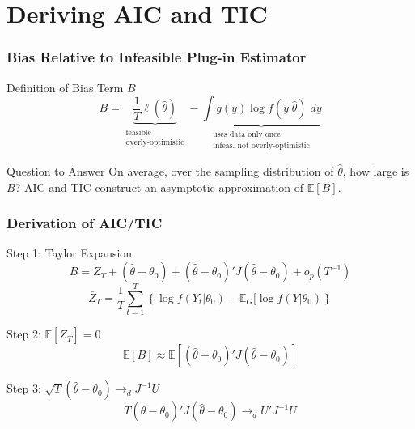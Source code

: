 \section{Deriving AIC and TIC}
\begin{frame}
  \frametitle{Bias Relative to Infeasible Plug-in Estimator}


  \begin{block}{Definition of Bias Term $B$}
  \[
    B = \underbrace{\frac{1}{T} \ell(\widehat{\theta})}_{\substack{ \text{feasible}\\ \text{overly-optimistic}}} - \underbrace{\int g(y) \log f(y|\widehat{\theta})\; dy}_{\substack{\text{uses data only once} \\ \text{infeas.\ not overly-optimistic}}}
  \]
\end{block}

\pause

\begin{alertblock}{Question to Answer}
  On average, over the sampling distribution of $\widehat{\theta}$, how large is $B$? AIC and TIC construct an asymptotic approximation of $\mathbb{E}[B]$.
\end{alertblock}

\end{frame}
\begin{frame}
  \frametitle{Derivation of AIC/TIC}
  \begin{block}{Step 1: Taylor Expansion}
    \vspace{-1em}
    \[B = \bar{Z}_T + (\widehat{\theta} - \theta_0) + (\widehat{\theta} - \theta_0)' J  (\widehat{\theta} - \theta_0) + o_p(T^{-1})\]
    \footnotesize
    \[\bar{Z}_T = \frac{1}{T} \sum_{t=1}^T \left\{ \log f(Y_t|\theta_0) - \mathbb{E}_G[\log f(Y|\theta_0) \right\}\]
  \end{block}

  \vspace{-1em}

  \pause

  \begin{block}{Step 2: $\mathbb{E}[\bar{Z}_T] = 0$}
    \vspace{-1.5em}
    \[\mathbb{E}[B] \approx \mathbb{E}\left[ (\widehat{\theta} - \theta_0)'J(\widehat{\theta} - \theta_0) \right]\]
  \end{block}

  \pause

  \vspace{-1em}

  \begin{block}{Step 3: $\sqrt{T}(\widehat{\theta} - \theta_0) \rightarrow_d J^{-1}U$}
    \vspace{-1.5em}
    \[
      T(\widehat{\theta} - \theta_0)'J(\widehat{\theta} - \theta_0) \rightarrow_d U'J^{-1}U
    \]
  \end{block}

\end{frame}
